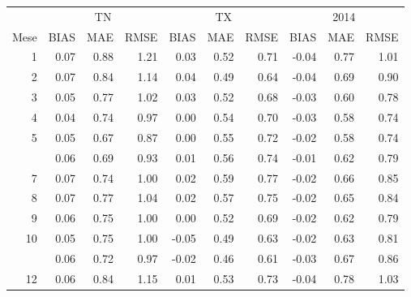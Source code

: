 
\begin{tabular}[t]{rrrrrrrrrr}
\toprule
\multicolumn{1}{c}{ } & \multicolumn{3}{c}{TN} & \multicolumn{3}{c}{TX} & \multicolumn{3}{c}{2014\tnote{*}} \\
\cmidrule(l{3pt}r{3pt}){2-4} \cmidrule(l{3pt}r{3pt}){5-7} \cmidrule(l{3pt}r{3pt}){8-10}
Mese & BIAS & MAE & RMSE & BIAS & MAE & RMSE & BIAS & MAE & RMSE\\
\midrule
1 & 0.07 & 0.88 & 1.21 & 0.03 & 0.52 & 0.71 & -0.04 & 0.77 & 1.01\\
2 & 0.07 & 0.84 & 1.14 & 0.04 & 0.49 & 0.64 & -0.04 & 0.69 & 0.90\\
3 & 0.05 & 0.77 & 1.02 & 0.03 & 0.52 & 0.68 & -0.03 & 0.60 & 0.78\\
4 & 0.04 & 0.74 & 0.97 & 0.00 & 0.54 & 0.70 & -0.03 & 0.58 & 0.74\\
5 & 0.05 & 0.67 & 0.87 & 0.00 & 0.55 & 0.72 & -0.02 & 0.58 & 0.74\\
\addlinespace
6 & 0.06 & 0.69 & 0.93 & 0.01 & 0.56 & 0.74 & -0.01 & 0.62 & 0.79\\
7 & 0.07 & 0.74 & 1.00 & 0.02 & 0.59 & 0.77 & -0.02 & 0.66 & 0.85\\
8 & 0.07 & 0.77 & 1.04 & 0.02 & 0.57 & 0.75 & -0.02 & 0.65 & 0.84\\
9 & 0.06 & 0.75 & 1.00 & 0.00 & 0.52 & 0.69 & -0.02 & 0.62 & 0.79\\
10 & 0.05 & 0.75 & 1.00 & -0.05 & 0.49 & 0.63 & -0.02 & 0.63 & 0.81\\
\addlinespace
11 & 0.06 & 0.72 & 0.97 & -0.02 & 0.46 & 0.61 & -0.03 & 0.67 & 0.86\\
12 & 0.06 & 0.84 & 1.15 & 0.01 & 0.53 & 0.73 & -0.04 & 0.78 & 1.03\\
\bottomrule
\end{tabular}